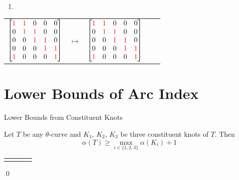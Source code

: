 \begin{frame}
	\begin{enumerate}
		\item[\mybf{CASE 1.}] 
	\end{enumerate}
	\vspace*{-10pt}
	\begin{tabu}{X[5c]X[c]X[5c]X[c]X[5c]}
		$\begin{bmatrix}
			\textcolor{red}{1} & \textcolor{red}{1} & 0 & 0 & 0\\
			0 & \textcolor{red}{1} & \textcolor{red}{1} & 0 & 0\\
			0 & 0 & \textcolor{red}{1} & \textcolor{red}{1} & 0\\
			0 & 0 & 0 & \textcolor{red}{1} & \textcolor{red}{1}\\
			\textcolor{red}{1} & 0 & 0 & 0 & \textcolor{red}{1}
		\end{bmatrix}$ &
		$\longmapsto$ &
		$\begin{bmatrix}
			\textcolor{red}{1} & \textcolor{red}{1} & 0 & 0 & 0\\
			0 & \textcolor{red}{1} & \textcolor{red}{1} & 0 & 0\\
			0 & 0 & \textcolor{red}{1} & \textcolor{red}{1} & 0\\
			0 & 0 & 0 & \textcolor{red}{1} & \textcolor{red}{1}\\
			\textcolor{red}{1} & 0 & 0 & 0 & \textcolor{red}{1}
		\end{bmatrix}$
	\end{tabu}
\end{frame}


\section{Lower Bounds of Arc Index}

\begin{frame}{Lower Bounds from Constituent Knots}
	\begin{thm}
		Let $T$ be any $\theta$-curve
		and $K_1$, $K_2$, $K_3$ be three constituent knots of $T$.
		Then
		\[
			\alpha(T) \ge \max_{i\in\{1,2,3\}} \alpha(K_i) + 1
		\]
	\end{thm}
	

	\mypf

	\begin{tabu}{X[c]X[c]X[c]X[c]}
			 &
			 &
			 &
	\end{tabu}
	\hfill\qed
\end{frame}


